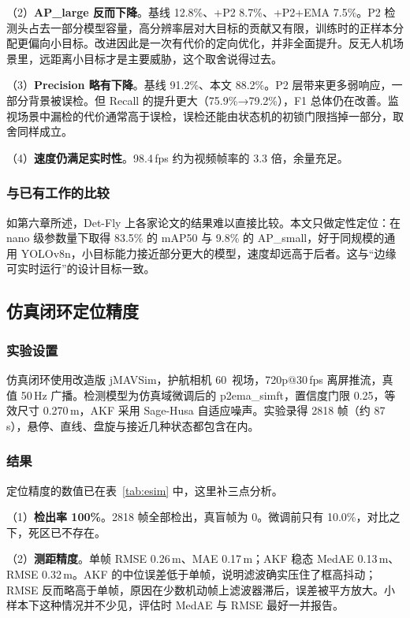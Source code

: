 （2）\textbf{AP\_large 反而下降}。基线 12.8\%、+P2 8.7\%、+P2+EMA 7.5\%。P2 检测头占去一部分模型容量，高分辨率层对大目标的贡献又有限，训练时的正样本分配更偏向小目标。改进因此是一次有代价的定向优化，并非全面提升。反无人机场景里，远距离小目标才是主要威胁，这个取舍说得过去。

（3）\textbf{Precision 略有下降}。基线 91.2\%、本文 88.2\%。P2 层带来更多弱响应，一部分背景被误检。但 Recall 的提升更大（75.9\%→79.2\%），F1 总体仍在改善。监视场景中漏检的代价通常高于误检，误检还能由状态机的初锁门限挡掉一部分，取舍同样成立。

（4）\textbf{速度仍满足实时性}。98.4\,fps 约为视频帧率的 3.3 倍，余量充足。

\subsubsection{与已有工作的比较}

如第六章所述，Det-Fly 上各家论文的结果难以直接比较。本文只做定性定位：在 nano 级参数量下取得 83.5\% 的 mAP50 与 9.8\% 的 AP\_small，好于同规模的通用 YOLOv8n，小目标能力接近部分更大的模型，速度却远高于后者。这与“边缘可实时运行”的设计目标一致。

\subsection{仿真闭环定位精度}

\subsubsection{实验设置}

仿真闭环使用改造版 jMAVSim，护航相机 60\textdegree\ 视场，720p@30\,fps 离屏推流，真值 50\,Hz 广播。检测模型为仿真域微调后的 p2ema\_simft，置信度门限 0.25，等效尺寸 0.270\,m，AKF 采用 Sage-Husa 自适应噪声。实验录得 2818 帧（约 87\,s），悬停、直线、盘旋与接近几种状态都包含在内。

\subsubsection{结果}

定位精度的数值已在表~\ref{tab:esim} 中，这里补三点分析。

（1）\textbf{检出率 100\%}。2818 帧全部检出，真盲帧为 0。微调前只有 10.0\%，对比之下，死区已不存在。

（2）\textbf{测距精度}。单帧 RMSE 0.26\,m、MAE 0.17\,m；AKF 稳态 MedAE 0.13\,m、RMSE 0.32\,m。AKF 的中位误差低于单帧，说明滤波确实压住了框高抖动；RMSE 反而略高于单帧，原因在少数机动帧上滤波器滞后，误差被平方放大。小样本下这种情况并不少见，评估时 MedAE 与 RMSE 最好一并报告。


